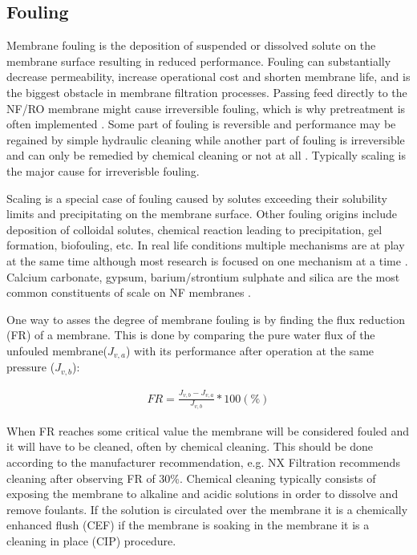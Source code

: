 \subsection{Fouling}
\label{Fouling}
Membrane fouling is the deposition of suspended or dissolved solute on the membrane surface resulting in reduced performance.
Fouling can substantially decrease permeability, increase operational cost and shorten membrane life, and is the biggest obstacle in membrane filtration processes. 
\citep{nanofiltration_2021_bog_fraMorten} 
Passing feed directly to the NF/RO membrane might cause irreversible fouling, which is why pretreatment is often implemented \citep{farahanniRecoveryCoolingTower_2016}.
Some part of fouling is reversible and performance may be regained by simple hydraulic cleaning  while another part of fouling is irreversible and can only be remedied by chemical cleaning or not at all \citep{seaderSeparationProcessPrinciples2006,nanofiltration_2021_bog_fraMorten}.
Typically scaling is the major cause for irreverisble fouling.%

Scaling is a special case of fouling caused by solutes exceeding their solubility limits and precipitating on the membrane surface.
Other fouling origins include deposition of colloidal solutes, chemical reaction leading to precipitation, gel formation, biofouling, etc. 
In real life conditions multiple mechanisms are at play at the same time although most research is focused on one mechanism at a time \citep{nanofiltration_2021_bog_fraMorten}.
Calcium carbonate, gypsum, barium/strontium sulphate and silica are the most common constituents of scale on NF membranes \citep{vanderbruggenDrawbacksApplyingNanofiltration2008}.


One way to asses the degree of membrane fouling is by finding the flux reduction (FR) of a membrane.
This is done by comparing the pure water flux of the unfouled membrane($J_{v,a}$) with its performance after operation at the same pressure ($J_{v,b}$):  
\begin{ceqn}
    \begin{align}
        FR = \frac{J_{v,b}-J_{v,a}}{J_{v,b}}*100 (\%)
    \end{align}
\end{ceqn}
When FR reaches some critical value the membrane will be considered fouled and it will have to be cleaned, often by chemical cleaning. 
This should be done according to the manufacturer recommendation, e.g. NX Filtration recommends cleaning after observing FR of 30\%. \citep{NXfiltration_operation_manual} 
Chemical cleaning typically consists of exposing the membrane to alkaline and acidic solutions in order to dissolve and remove foulants.
If the solution is circulated over the membrane it is a chemically enhanced flush (CEF) if the membrane is soaking in the membrane it is a cleaning in place (CIP) procedure.  \citep{NXfiltration_operation_manual}

